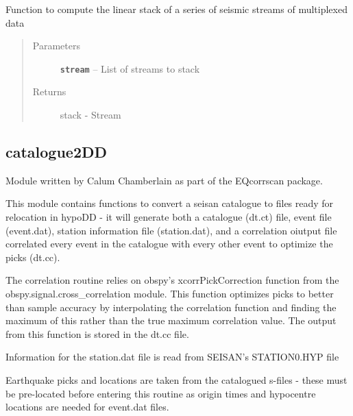 \documentclass[a4paper,10pt,english]{sphinxmanual}
\begin{document}

\begin{fulllineitems}
\label{submodules/utils.stacking:stacking.linstack}
Function to compute the linear stack of a series of seismic streams of
multiplexed data
\begin{quote}\begin{description}
\item[{Parameters}] \leavevmode
\textbf{\texttt{stream}} -- List of streams to stack

\item[{Returns}] \leavevmode
stack - Stream

\end{description}\end{quote}

\end{fulllineitems}



\subsection{catalogue2DD}
\label{submodules/utils.catalogue2DD:module-catalogue2DD}\label{submodules/utils.catalogue2DD::doc}\label{submodules/utils.catalogue2DD:catalogue2dd}
Module written by Calum Chamberlain as part of the EQcorrscan package.

This module contains functions to convert a seisan catalogue to files ready for
relocation in hypoDD - it will generate both a catalogue (dt.ct) file, event
file (event.dat), station information file (station.dat), and a correlation
oiutput file correlated every event in the catalogue with every other event to
optimize the picks (dt.cc).

The correlation routine relies on obspy's xcorrPickCorrection function from the
obspy.signal.cross\_correlation module.  This function optimizes picks to better
than sample accuracy by interpolating the correlation function and finding the
maximum of this rather than the true maximum correlation value.  The output
from this function is stored in the dt.cc file.

Information for the station.dat file is read from SEISAN's STATION0.HYP file

Earthquake picks and locations are taken from the catalogued s-files - these
must be pre-located before entering this routine as origin times and hypocentre
locations are needed for event.dat files.
\end{document}
